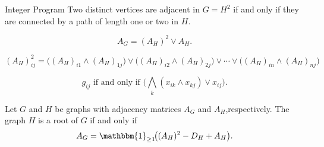 \documentclass[10pt]{beamer}
\begin{document}
\begin{frame}{Integer Program}
    Two distinct vertices are adjacent in $G=H^2$ if and only if they are connected by a path of length one or two in $H$.

    \begin{equation} \label{eq::fund_adj_square_or}
        A_G = (A_H)^2 \lor A_H.
    \end{equation}

     $\displaystyle (A_H)^2_{ij} = \big( (A_H)_{i1} \land (A_H)_{1j} \big) \lor \big( (A_H)_{i2} \land (A_H)_{2j} \big) \lor \cdots \lor \big( (A_H)_{in} \land (A_H)_{nj} \big)$

    \begin{equation} \label{eq::sat_square}
        g_{ij} \text{ if and only if } \big( \bigwedge_k (x_{ik} \land x_{kj}) \lor x_{ij} \big). 
    \end{equation}
    
    \begin{lemma} \label{lemma::G_equal_to_H^2}
        Let $G$ and $H$ be graphs with adjacency matrices $A_G$ and $A_H$,respectively. The graph $H$ is a root of $G$ if and only if 
        \[ 
            A_G = \mathbbm{1}_{\geq 1}\!\big((A_H)^2 - D_H + A_H\big).
        \]
    \end{lemma}
\end{frame}
\end{document}
